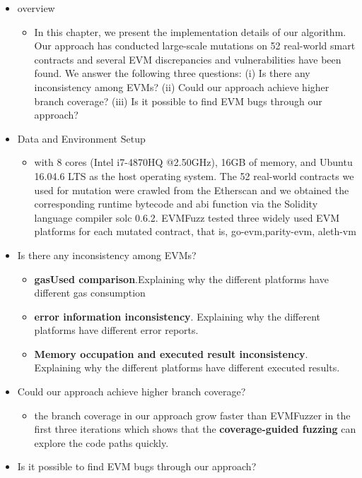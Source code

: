 \documentclass[a4paper]{article}
\begin{document}
	\begin{itemize}
		\item overview
		\begin{itemize}
			\item In this chapter, we present the implementation details of our algorithm. Our approach has conducted large-scale mutations on 52 real-world smart contracts and several EVM discrepancies and vulnerabilities have been found. We answer the following three questions: (i) Is there any
			inconsistency among EVMs? (ii) Could our approach achieve higher
			branch coverage? (iii) Is it possible to
			find EVM bugs through our approach?
		\end{itemize}
		\item Data and Environment Setup
		\begin{itemize}
			\item with 8 cores (Intel
			i7-4870HQ @2.50GHz), 16GB of memory, and Ubuntu 16.04.6 LTS as the
			host operating system. The 52 real-world contracts we used
			for mutation were crawled from the Etherscan and we obtained the corresponding runtime bytecode and abi function via the Solidity
			language compiler solc 0.6.2. EVMFuzz tested three widely
			used EVM platforms for each mutated contract, that is, go-evm,parity-evm, aleth-vm
		\end{itemize}
		\item Is there any
		inconsistency among EVMs?
		\begin{itemize}
			\item \textbf{gasUsed comparison}.Explaining why the different platforms have different gas consumption
			\item \textbf{error information inconsistency}. Explaining why the different platforms have different error reports.
			\item \textbf{Memory occupation and executed result inconsistency}. Explaining why the different platforms have different executed results.
		\end{itemize} 
		\item Could our approach achieve higher
		branch coverage?
		\begin{itemize}
			\item the branch coverage in our approach grow faster than EVMFuzzer in the first three iterations which shows that the \textbf{coverage-guided fuzzing} can explore the code paths quickly.
		\end{itemize}
		\item Is it possible to
		find EVM bugs through our approach?
	\end{itemize}
\end{document}
